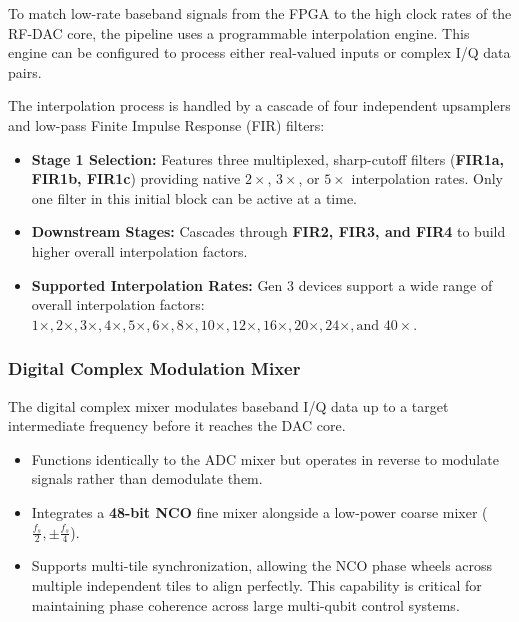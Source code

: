 \documentclass[
]{article}
\providecommand{\tightlist}{%
  \setlength{\itemsep}{0pt}\setlength{\parskip}{0pt}}
\begin{document}
To match low-rate baseband signals from the FPGA to the high clock rates
of the RF-DAC core, the pipeline uses a programmable interpolation
engine. This engine can be configured to process either real-valued
inputs or complex I/Q data pairs.

The interpolation process is handled by a cascade of four independent
upsamplers and low-pass Finite Impulse Response (FIR) filters:

\begin{itemize}
\tightlist
\item
  \textbf{Stage 1 Selection:} Features three multiplexed, sharp-cutoff
  filters (\textbf{FIR1a, FIR1b, FIR1c}) providing native \(2\times\),
  \(3\times\), or \(5\times\) interpolation rates. Only one filter in
  this initial block can be active at a time.
\item
  \textbf{Downstream Stages:} Cascades through \textbf{FIR2, FIR3, and
  FIR4} to build higher overall interpolation factors.
\item
  \textbf{Supported Interpolation Rates:} Gen 3 devices support a wide
  range of overall interpolation factors:
  \(1\times, 2\times, 3\times, 4\times, 5\times, 6\times, 8\times, 10\times, 12\times, 16\times, 20\times, 24\times, \text{and } 40\times\).
\end{itemize}

\subsubsection{Digital Complex Modulation
Mixer}\label{digital-complex-modulation-mixer}

The digital complex mixer modulates baseband I/Q data up to a target
intermediate frequency before it reaches the DAC core.

\begin{itemize}
\tightlist
\item
  Functions identically to the ADC mixer but operates in reverse to
  modulate signals rather than demodulate them.
\item
  Integrates a \textbf{48-bit NCO} fine mixer alongside a low-power
  coarse mixer (\(\frac{f_s}{2}, \pm\frac{f_s}{4}\)).
\item
  Supports multi-tile synchronization, allowing the NCO phase wheels
  across multiple independent tiles to align perfectly. This capability
  is critical for maintaining phase coherence across large multi-qubit
  control systems.
\end{itemize}
\end{document}
